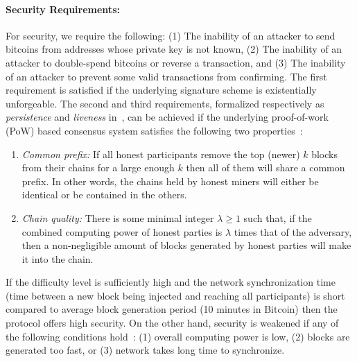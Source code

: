 \documentclass[]{report}   %
\begin{document}
\paragraph{Security Requirements:} For security, we require the following: (1) The inability of an attacker to send bitcoins from addresses whose private key is not known, (2) The inability of an attacker to double-spend bitcoins or reverse a transaction, and (3) The inability of an attacker to prevent some valid transactions from confirming. The first requirement is satisfied if the underlying signature scheme is existentially unforgeable. The second and third requirements, formalized respectively as {\em persistence} and {\em liveness} in~\cite{Garay2015}, can be achieved if the underlying proof-of-work (PoW) based consensus system satisfies the following two properties~\cite{Garay2015}:
\begin{enumerate}
	\item {\em Common prefix:} If all honest participants remove the top (newer) $k$ blocks from their chains for a large enough $k$ then all of them will share a common prefix. In other words, the chains held by honest miners will either be identical or be contained in the others.
	\item {\em Chain quality:} There is some minimal integer $\lambda\geq 1$ such that, if the combined computing power of honest parties is $\lambda$ times that of the adversary, then a non-negligible amount of blocks generated by honest parties will make it into the chain. 
\end{enumerate}

If the difficulty level is sufficiently high and the network synchronization time (time between a new block being injected and reaching all participants) is short compared to average block generation period (10 minutes in Bitcoin) then the protocol offers high security. On the other hand, security is weakened if any of the following conditions hold~\cite{Garay2015}:
(1) overall computing power is low, (2) blocks are generated too fast, or (3) network takes long time to synchronize. 
\end{document}
